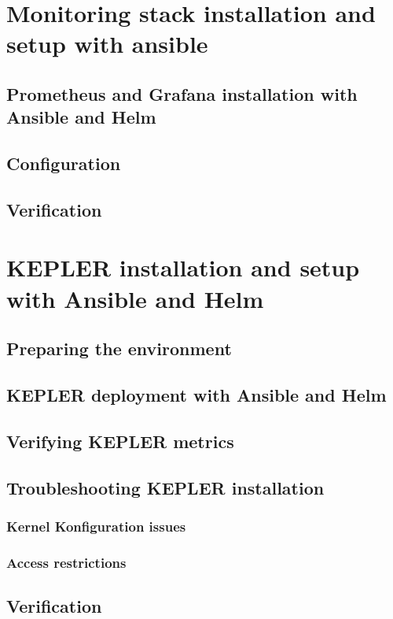 \section{Monitoring stack installation and setup with ansible}
\subsection{Prometheus and Grafana installation with Ansible and Helm}
\subsection{Configuration}
\subsection{Verification}

\section{KEPLER installation and setup with Ansible and Helm}
\subsection{Preparing the environment}
\subsection{KEPLER deployment with Ansible and Helm}
\subsection{Verifying KEPLER metrics}
\subsection{Troubleshooting KEPLER installation}
\subsubsection{Kernel Konfiguration issues}
\subsubsection{Access restrictions}
\subsection{Verification}


